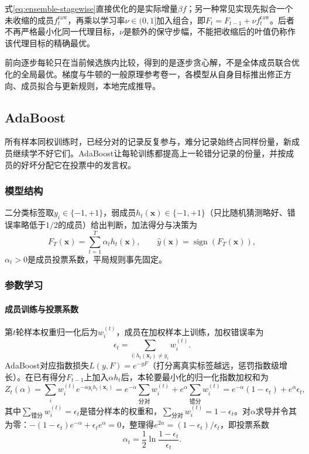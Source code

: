 式\eqref{eq:ensemble-stagewise}直接优化的是实际增量$\beta f$；另一种常见实现先拟合一个未收缩的成员$f_t^{\mathrm{raw}}$，再乘以学习率$\nu\in(0,1]$加入组合，即$F_t=F_{t-1}+\nu f_t^{\mathrm{raw}}$。后者不再严格最小化同一代理目标，$\nu$是额外的保守步幅，不能把收缩后的叶值仍称作该代理目标的精确最优。

前向逐步每轮只在当前候选族内比较，得到的是逐步贪心解，不是全体成员联合优化的全局最优。梯度与牛顿的一般原理参考卷一，各模型从自身目标推出修正方向、成员拟合与更新规则，本地完成推导。

\subsection{AdaBoost}
\label{sec:ensemble-adaboost}

所有样本同权训练时，已经分对的记录反复参与，难分记录始终占同样份量，新成员继续学不好它们。AdaBoost让每轮训练都提高上一轮错分记录的份量，并按成员的好坏分配它在投票中的发言权。

\subsubsection{模型结构}
二分类标签取$y_i\in\{-1,+1\}$，弱成员$h_t(\bm x)\in\{-1,+1\}$（只比随机猜测略好、错误率略低于$1/2$的成员）给出判断，加法得分与决策为
\begin{equation}
  F_T(\bm x)=\sum_{t=1}^T\alpha_t h_t(\bm x),
  \qquad
  \hat y(\bm x)=\operatorname{sign}(F_T(\bm x)),
  \label{eq:ensemble-adaboost-model}
\end{equation}
$\alpha_t>0$是成员投票系数，平局规则事先固定。

\subsubsection{参数学习}

\paragraph{成员训练与投票系数}
第$t$轮样本权重归一化后为$w_i^{(t)}$，成员在加权样本上训练，加权错误率为
\begin{equation}
  \epsilon_t=\sum_{i:h_t(\bm x_i)\neq y_i}w_i^{(t)}.
  \label{eq:ensemble-adaboost-error}
\end{equation}
AdaBoost对应指数损失$L(y,F)=e^{-yF}$（打分离真实标签越远，惩罚指数级增长）。在已有得分$F_{t-1}$上加入$\alpha h_t$后，本轮要最小化的归一化指数加权和为
\[
  Z_t(\alpha)=\sum_i w_i^{(t)}e^{-\alpha y_i h_t(\bm x_i)}
  =e^{-\alpha}\sum_{\text{分对}}w_i^{(t)}+e^{\alpha}\sum_{\text{错分}}w_i^{(t)}
  =e^{-\alpha}(1-\epsilon_t)+e^{\alpha}\epsilon_t,
\]
其中$\sum_{\text{错分}}w_i^{(t)}=\epsilon_t$是错分样本的权重和，$\sum_{\text{分对}}w_i^{(t)}=1-\epsilon_t$。对$\alpha$求导并令其为零：$-(1-\epsilon_t)e^{-\alpha}+\epsilon_t e^{\alpha}=0$，整理得$e^{2\alpha}=(1-\epsilon_t)/\epsilon_t$，即投票系数
\begin{equation}
  \alpha_t=\frac12\ln\frac{1-\epsilon_t}{\epsilon_t}.
  \label{eq:ensemble-adaboost-alpha}
\end{equation}

